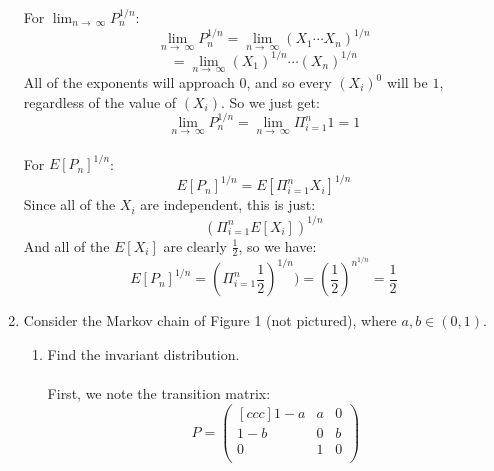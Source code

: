 \begin{enumerate}
    For $\lim_{n \to\ \infty} P_n^{1/n}$:
    $$\lim_{n \to\ \infty} P_n^{1/n} = \lim_{n \to\ \infty} (X_1 \cdots X_n)^{1/n}$$
    $$=\lim_{n \to\ \infty} (X_1)^{1/n} \cdots (X_n)^{1/n}$$
    All of the exponents will approach $0$, and so every $(X_i)^0$ will be $1$, regardless of the value of $(X_i)$. So we just get:
    $$\lim_{n \to\ \infty} P_n^{1/n} = \lim_{n \to\ \infty} \Pi_{i=1}^n 1 = 1$$\\

    For $E[P_n]^{1/n}$:
    $$E[P_n]^{1/n} = E[\Pi_{i=1}^n X_i]^{1/n}$$
    Since all of the $X_i$ are independent, this is just:
    $$(\Pi_{i=1}^n E[X_i])^{1/n}$$
    And all of the $E[X_i]$ are clearly $\frac{1}{2}$, so we have:
    $$E[P_n]^{1/n} = (\Pi_{i=1}^n \frac{1}{2})^{1/n}) = (\frac{1}{2})^{n^{{1/n}}} = \frac{1}{2}$$

  \item Consider the Markov chain of Figure 1 (not pictured), where $a,b \in (0,1)$.
    \begin{enumerate}
      \item Find the invariant distribution.\\\\

        First, we note the transition matrix:
        $$
        P =
        \begin{pmatrix}[ccc]
          1-a & a & 0\\
          1-b & 0 & b\\          
          0   & 1 & 0\\
        \end{pmatrix}
        $$


\end{enumerate}
\end{enumerate}
